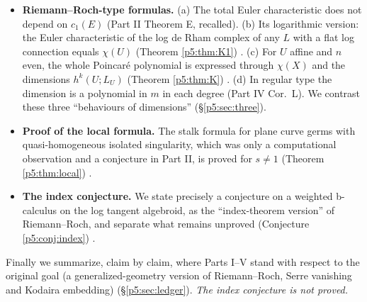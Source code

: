 \begin{itemize}
\item \textbf{Riemann--Roch-type formulas.} (a) The total Euler characteristic does not depend on $c_1(E)$ (Part II Theorem E, recalled). (b) Its logarithmic version: the Euler characteristic of the log de Rham complex of any $L$ with a flat log connection equals $\chi(U)$ (Theorem \ref{p5:thm:K1}) \tP. (c) For $U$ affine and $n$ even, the whole Poincar\'e polynomial is expressed through $\chi(X)$ and the dimensions $h^k(U;L_U)$ (Theorem \ref{p5:thm:K}) \tP\tV. (d) In regular type the dimension is a polynomial in $m$ in each degree (Part IV Cor.\ L). We contrast these three ``behaviours of dimensions'' (\S\ref{p5:sec:three}).
\item \textbf{Proof of the local formula.} The stalk formula for plane curve germs with quasi-homogeneous isolated singularity, which was only a computational observation and a conjecture in Part II, is proved for $s\neq1$ (Theorem \ref{p5:thm:local}) \tP.
\item \textbf{The index conjecture.} We state precisely a conjecture on a weighted b-calculus on the log tangent algebroid, as the ``index-theorem version'' of Riemann--Roch, and separate what remains unproved (Conjecture \ref{p5:conj:index}) \tK.
\end{itemize}
Finally we summarize, claim by claim, where Parts I--V stand with respect to the original goal (a generalized-geometry version of Riemann--Roch, Serre vanishing and Kodaira embedding) (\S\ref{p5:sec:ledger}). \emph{The index conjecture is not proved.}

